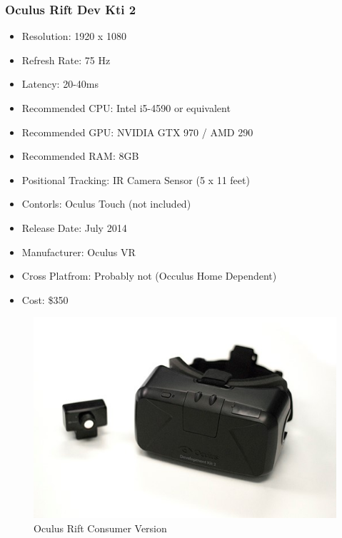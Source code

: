 \documentclass[a4paper,10pt]{article}
\begin{document}
\subsubsection{Oculus Rift Dev Kti 2}
\begin{itemize}
 \item Resolution: 1920 x 1080
 \item Refresh Rate: 75 Hz
 \item Latency: 20-40ms
 \item Recommended CPU: Intel i5-4590 or equivalent
 \item Recommended GPU: NVIDIA GTX 970 / AMD 290 
 \item Recommended RAM: 8GB
 \item Positional Tracking: IR Camera Sensor (5 x 11 feet)
 \item Contorls: Oculus Touch (not included)
 \item Release Date: July 2014
 \item Manufacturer: Oculus VR
 \item Cross Platfrom: Probably not (Occulus Home Dependent)
 \item Cost: \$350
\end{itemize}
\begin{figure}[H]
	\includegraphics[width=\linewidth,height=\paperheight,keepaspectratio]{dk2.jpg}
	\caption{Oculus Rift Consumer Version}
	\label{fig:Riftdk2Img}
	\end{figure}
	\pagebreak
\end{document}
